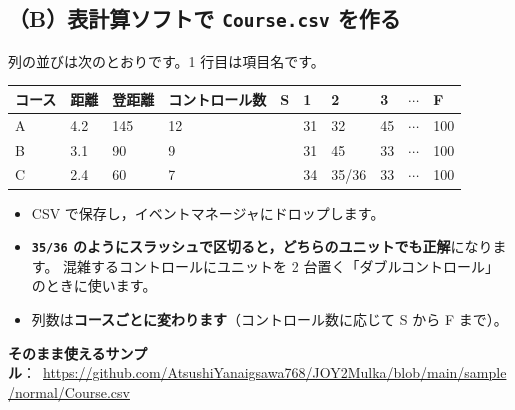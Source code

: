 \subsection*{（B）表計算ソフトで \texttt{Course.csv} を作る}

列の並びは次のとおりです。1 行目は項目名です。

\begin{center}
\small
\begin{tabular}{@{}llllllllll@{}}
\toprule
コース & 距離 & 登距離 & コントロール数 & S & 1 & 2 & 3 & $\cdots$ & F \\
\midrule
A & 4.2 & 145 & 12 & & 31 & 32 & 45 & $\cdots$ & 100 \\
B & 3.1 & 90  & 9  & & 31 & 45 & 33 & $\cdots$ & 100 \\
C & 2.4 & 60  & 7  & & 34 & 35/36 & 33 & $\cdots$ & 100 \\
\bottomrule
\end{tabular}
\end{center}

\begin{itemize}
\item CSV で保存し，イベントマネージャにドロップします。
\item \textbf{\texttt{35/36} のようにスラッシュで区切ると，どちらのユニットでも正解}になります。
      混雑するコントロールにユニットを 2 台置く「ダブルコントロール」のときに使います。
\item 列数は\textbf{コースごとに変わります}（コントロール数に応じて S から F まで）。
\end{itemize}

\textbf{そのまま使えるサンプル}：\ \url{https://github.com/AtsushiYanaigsawa768/JOY2Mulka/blob/main/sample/normal/Course.csv}

